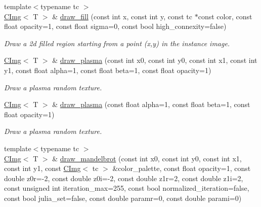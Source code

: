 \begin{DoxyCompactItemize}
{\footnotesize template$<$typename tc $>$ }\\\hyperlink{structcimg__library_1_1CImg}{CImg}$<$ T $>$ \& \hyperlink{structcimg__library_1_1CImg_a5c78c87e946126179b3fd659fd15a90f}{draw\_\-fill} (const int x, const int y, const tc $\ast$const color, const float opacity=1, const float sigma=0, const bool high\_\-connexity=false)
\begin{DoxyCompactList}\small\item\em Draw a 2d filled region starting from a point ({\ttfamily x},{\ttfamily y}) in the instance image. \item\end{DoxyCompactList}\item 
\hyperlink{structcimg__library_1_1CImg}{CImg}$<$ T $>$ \& \hyperlink{structcimg__library_1_1CImg_aaaf8df45b2e20d132a28cbdffef77c18}{draw\_\-plasma} (const int x0, const int y0, const int x1, const int y1, const float alpha=1, const float beta=1, const float opacity=1)
\begin{DoxyCompactList}\small\item\em Draw a plasma random texture. \item\end{DoxyCompactList}\item 
\hyperlink{structcimg__library_1_1CImg}{CImg}$<$ T $>$ \& \hyperlink{structcimg__library_1_1CImg_ad8b2f5c685dbc7389dfb94217f4db8d2}{draw\_\-plasma} (const float alpha=1, const float beta=1, const float opacity=1)
\begin{DoxyCompactList}\small\item\em Draw a plasma random texture. \item\end{DoxyCompactList}\item 
\hypertarget{structcimg__library_1_1CImg_a82f59bc2e19cec0c5b6ba20914b115b7}{
{\footnotesize template$<$typename tc $>$ }\\\hyperlink{structcimg__library_1_1CImg}{CImg}$<$ T $>$ \& \hyperlink{structcimg__library_1_1CImg_a82f59bc2e19cec0c5b6ba20914b115b7}{draw\_\-mandelbrot} (const int x0, const int y0, const int x1, const int y1, const \hyperlink{structcimg__library_1_1CImg}{CImg}$<$ tc $>$ \&color\_\-palette, const float opacity=1, const double z0r=-\/2, const double z0i=-\/2, const double z1r=2, const double z1i=2, const unsigned int iteration\_\-max=255, const bool normalized\_\-iteration=false, const bool julia\_\-set=false, const double paramr=0, const double parami=0)}
\label{structcimg__library_1_1CImg_a82f59bc2e19cec0c5b6ba20914b115b7}


\end{DoxyCompactItemize}
